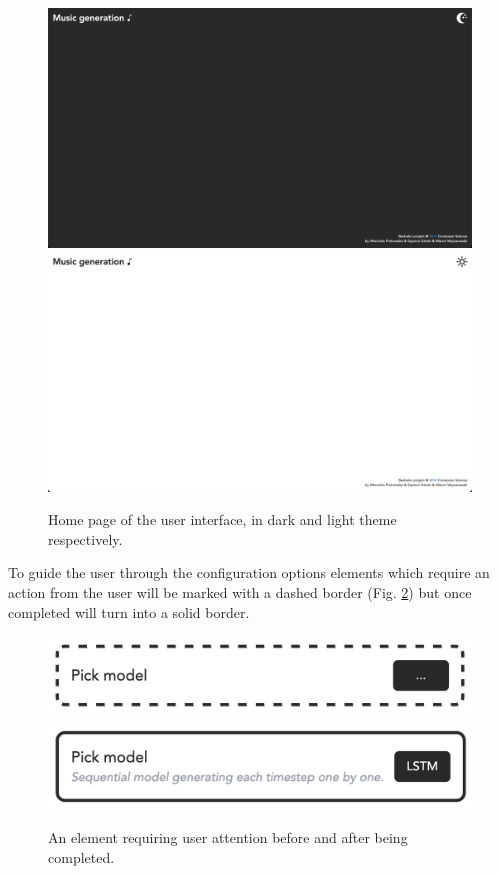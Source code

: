 \documentclass{article}
\begin{document}
\begin{figure}[H]
    \centering
    \includegraphics[width=\linewidth]{gui_dark.png}
    \includegraphics[width=\linewidth]{gui_light.png}
    \caption{Home page of the user interface, in dark and light theme respectively.}
    \label{fig:gui_home}
\end{figure}


To guide the user through the configuration options elements which require an action from the user will be marked with a dashed border (Fig. \ref{fig:gui_action}) but once completed will turn into a solid border.

\begin{figure}[H]
    \centering
    \includegraphics[width=0.6\linewidth]{gui_action_todo.png}
    \includegraphics[width=0.6\linewidth]{gui_action_done.png}
    \caption{An element requiring user attention before and after being completed.}
    \label{fig:gui_action}
\end{figure}
\end{document}

